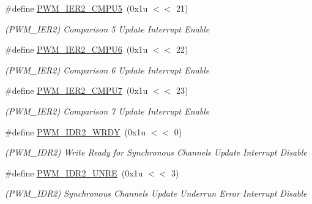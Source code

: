 \begin{DoxyCompactItemize}
\mbox{\label{group__SAMS70__PWM_gaffffa6f11a120f504a27311afad72182}} 
\#define \mbox{\hyperlink{group__SAMS70__PWM_gaffffa6f11a120f504a27311afad72182}{P\+W\+M\+\_\+\+I\+E\+R2\+\_\+\+C\+M\+P\+U5}}~(0x1u $<$$<$ 21)
\begin{DoxyCompactList}\small\item\em (P\+W\+M\+\_\+\+I\+E\+R2) Comparison 5 Update Interrupt Enable \end{DoxyCompactList}\item 
\mbox{\label{group__SAMS70__PWM_ga4540e6876cf084b0b43a3babddcb6eeb}} 
\#define \mbox{\hyperlink{group__SAMS70__PWM_ga4540e6876cf084b0b43a3babddcb6eeb}{P\+W\+M\+\_\+\+I\+E\+R2\+\_\+\+C\+M\+P\+U6}}~(0x1u $<$$<$ 22)
\begin{DoxyCompactList}\small\item\em (P\+W\+M\+\_\+\+I\+E\+R2) Comparison 6 Update Interrupt Enable \end{DoxyCompactList}\item 
\mbox{\label{group__SAMS70__PWM_ga61e0f7f0a72e26960e25d864347fd490}} 
\#define \mbox{\hyperlink{group__SAMS70__PWM_ga61e0f7f0a72e26960e25d864347fd490}{P\+W\+M\+\_\+\+I\+E\+R2\+\_\+\+C\+M\+P\+U7}}~(0x1u $<$$<$ 23)
\begin{DoxyCompactList}\small\item\em (P\+W\+M\+\_\+\+I\+E\+R2) Comparison 7 Update Interrupt Enable \end{DoxyCompactList}\item 
\mbox{\label{group__SAMS70__PWM_ga98ee7de3368f975b0eea10fcefb8c2f2}} 
\#define \mbox{\hyperlink{group__SAMS70__PWM_ga98ee7de3368f975b0eea10fcefb8c2f2}{P\+W\+M\+\_\+\+I\+D\+R2\+\_\+\+W\+R\+DY}}~(0x1u $<$$<$ 0)
\begin{DoxyCompactList}\small\item\em (P\+W\+M\+\_\+\+I\+D\+R2) Write Ready for Synchronous Channels Update Interrupt Disable \end{DoxyCompactList}\item 
\mbox{\label{group__SAMS70__PWM_ga94428564f270df1c0e1605970f49f669}} 
\#define \mbox{\hyperlink{group__SAMS70__PWM_ga94428564f270df1c0e1605970f49f669}{P\+W\+M\+\_\+\+I\+D\+R2\+\_\+\+U\+N\+RE}}~(0x1u $<$$<$ 3)
\begin{DoxyCompactList}\small\item\em (P\+W\+M\+\_\+\+I\+D\+R2) Synchronous Channels Update Underrun Error Interrupt Disable \end{DoxyCompactList}\item 
$$
\end{DoxyCompactItemize}
